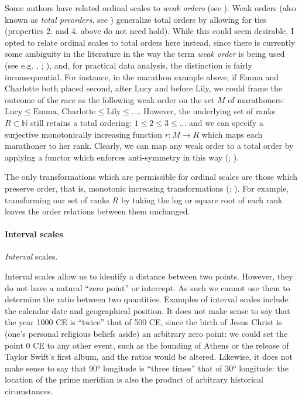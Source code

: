 \documentclass[
]{book}
\theoremstyle{definition}
\theoremstyle{definition}
\theoremstyle{definition}
\theoremstyle{definition}
\theoremstyle{remark}
\begin{document}
Some authors have related ordinal scales to \emph{weak orders} (see ). Weak orders (also known as \emph{total preorders}, see ) generalize total orders by allowing for ties (properties 2. and 4. above do not need hold). While this could seem desirable, I opted to relate ordinal scales to total orders here instead, since there is currently some ambiguity in the literature in the way the term \emph{weak order} is being used (see e.g. , ; ), and, for practical data analysis, the distinction is fairly inconsequential. For instance, in the marathon example above, if Emma and Charlotte both placed second, after Lucy and before Lily, we could frame the outcome of the race as the following weak order on the set \(M\) of marathoners: \(\text{Lucy} \leq \text{Emma, Charlotte} \leq \text{Lily} \leq ...\). However, the underlying set of ranks \(R \subset \mathbb{N}\) still retains a total ordering: \(1 \leq 2 \leq 3 \leq \ldots\) and we can specify a surjective monotonically increasing function \(r: M \to R\) which maps each marathoner to her rank. Clearly, we can map any weak order to a total order by applying a functor which enforces anti-symmetry in this way (; ).

The only transformations which are permissible for ordinal scales are those which preserve order, that is, monotonic increasing transformations (; ). For example, transforming our set of ranks \(R\) by taking the log or square root of each rank leaves the order relations between them unchanged.

\paragraph{Interval scales}\label{interval-scales}

\emph{Interval} scales.

Interval scales allow us to identify a distance between two points. However, they do not have a natural ``zero point'' or intercept. As such we cannot use them to determine the ratio between two quantities. Examples of interval scales include the calendar date and geographical position. It does not make sense to say that the year 1000 CE is ``twice'' that of 500 CE, since the birth of Jesus Christ is (one's personal religious beliefs aside) an arbitrary zero point: we could set the point 0 CE to any other event, such as the founding of Athens or the release of Taylor Swift's first album, and the ratios would be altered. Likewise, it does not make sense to say that 90° longitude is ``three times'' that of 30° longitude: the location of the prime meridian is also the product of arbitrary historical cirumstances.
\end{document}
